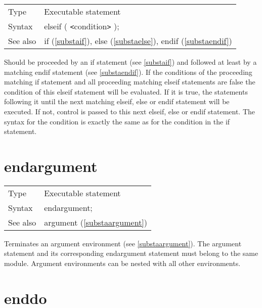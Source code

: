 \noindent \begin{tabular}{ll}
Type & Executable statement\\
Syntax & elseif ( {\tt<}condition{\tt>} );
\\ See also & if (\ref{substaif}),
              else (\ref{substaelse}),
              endif (\ref{substaendif})
\end{tabular} \vspace{4mm}

\noindent Should be proceeded by an if 
statement (see \ref{substaif}) and followed at least by a matching 
endif 
statement (see \ref{substaendif}). If the conditions of the proceeding 
matching if statement and all proceeding matching
elseif statements are false the 
condition of this elseif statement will be evaluated. If it is true, the 
statements following it until the next matching elseif,
else or endif statement will be executed. 
If not, control is passed to this next elseif, else or endif statement. The 
syntax for the condition is exactly the same as for the condition in the if 
statement. \vspace{10mm}
 

\section{endargument}
\label{substaendargument}

\noindent \begin{tabular}{ll}
Type & Executable statement\\
Syntax & endargument; \\
See also & argument (\ref{substaargument})
\end{tabular} \vspace{4mm}

\noindent Terminates an argument environment 
(see \ref{substaargument}). The argument statement and its 
corresponding endargument statement must belong to the 
same module. Argument environments can be nested with all other 
environments. \vspace{10mm}


\section{enddo}
\label{substaenddo}

